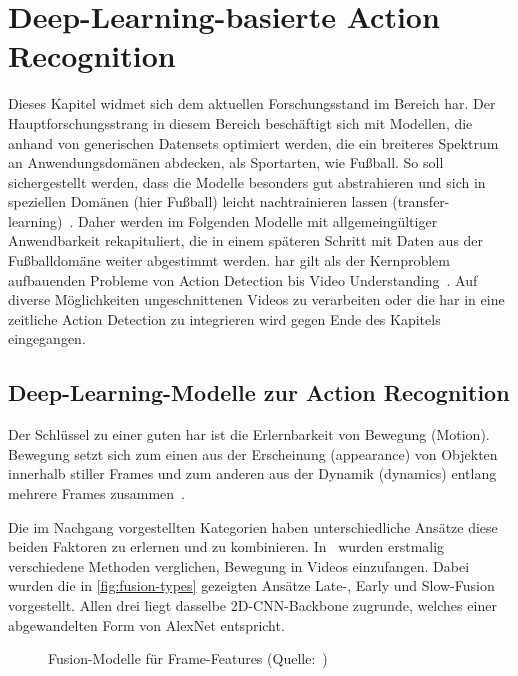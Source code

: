 \chapter{Deep-Learning-basierte Action Recognition}
\label{ch:sota}

Dieses Kapitel widmet sich dem aktuellen Forschungsstand im Bereich \gls{har}.
Der Hauptforschungsstrang in diesem Bereich beschäftigt sich mit Modellen, die anhand von generischen Datensets optimiert werden, die ein breiteres Spektrum an Anwendungsdomänen abdecken, als Sportarten, wie Fußball.
So soll sichergestellt werden, dass die Modelle besonders gut abstrahieren und sich in speziellen Domänen (hier Fußball) leicht nachtrainieren lassen (\gls{transfer-learning})~\cite{Burkov19}.
Daher werden im Folgenden Modelle mit allgemeingültiger Anwendbarkeit rekapituliert, die in einem späteren Schritt mit Daten aus der Fußballdomäne weiter abgestimmt werden.
\gls{har} gilt als der Kernproblem aufbauenden Probleme von Action Detection bis Video Understanding~\cite{Jiang19,Xia20}.
Auf diverse Möglichkeiten ungeschnittenen Videos zu verarbeiten oder die \gls{har} in eine zeitliche Action Detection zu integrieren wird gegen Ende des Kapitels eingegangen.

\section{Deep-Learning-Modelle zur Action Recognition}
\label{sec:deep-learning-modelle-zur-action-recognition}

Der Schlüssel zu einer guten \gls{har} ist die Erlernbarkeit von Bewegung (Motion).
Bewegung setzt sich zum einen aus der Erscheinung (appearance) von Objekten innerhalb stiller Frames und zum anderen aus der Dynamik (dynamics) entlang mehrere Frames zusammen~\cite{Sun15,Wang16}.

Die im Nachgang vorgestellten Kategorien haben unterschiedliche Ansätze diese beiden Faktoren zu erlernen und zu kombinieren.
In~\cite{Karpathy14} wurden erstmalig verschiedene Methoden verglichen, Bewegung in Videos einzufangen.
Dabei wurden die in \autoref{fig:fusion-types} gezeigten Ansätze Late-, Early und Slow-Fusion vorgestellt.
Allen drei liegt dasselbe 2D-CNN-Backbone zugrunde, welches einer abgewandelten Form von AlexNet entspricht.

\begin{figure}[h!]
    \centering
    \caption[Fusion-Modelle für Frame-Features]{Fusion-Modelle für Frame-Features (Quelle:~\cite{Karpathy14})}
    \label{fig:fusion-types}
\end{figure}

